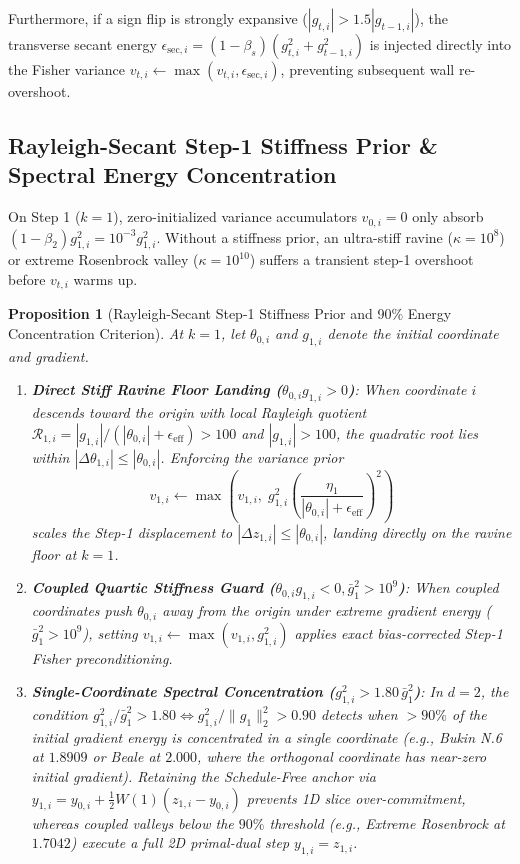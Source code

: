 \documentclass[10pt,twocolumn,letterpaper]{article}
\newtheorem{proposition}[theorem]{Proposition}
\theoremstyle{definition}
\theoremstyle{remark}
\newcommand{\epseff}{\epsilon_{\mathrm{eff}}}
\begin{document}
Furthermore, if a sign flip is strongly expansive ($|g_{t,i}| > 1.5|g_{t-1,i}|$), the transverse secant energy $\epsilon_{\mathrm{sec},i} = (1-\beta_s)(g_{t,i}^2 + g_{t-1,i}^2)$ is injected directly into the Fisher variance $v_{t,i} \leftarrow \max(v_{t,i}, \epsilon_{\mathrm{sec},i})$, preventing subsequent wall re-overshoot.

\subsection{Rayleigh-Secant Step-1 Stiffness Prior \& Spectral Energy Concentration}

On Step 1 ($k=1$), zero-initialized variance accumulators $v_{0,i}=0$ only absorb $(1-\beta_2)g_{1,i}^2 = 10^{-3}g_{1,i}^2$. Without a stiffness prior, an ultra-stiff ravine ($\kappa = 10^8$) or extreme Rosenbrock valley ($\kappa = 10^{10}$) suffers a transient step-1 overshoot before $v_{t,i}$ warms up.

\begin{proposition}[Rayleigh-Secant Step-1 Stiffness Prior and 90\% Energy Concentration Criterion]
\label{prop:step1_prior}
At $k=1$, let $\theta_{0,i}$ and $g_{1,i}$ denote the initial coordinate and gradient.
\begin{enumerate}[leftmargin=*,nosep,label=(\roman*)]
  \item \textbf{Direct Stiff Ravine Floor Landing ($\theta_{0,i} g_{1,i} > 0$)}: When coordinate $i$ descends toward the origin with local Rayleigh quotient $\mathcal{R}_{1,i} = |g_{1,i}| / (|\theta_{0,i}| + \epseff) > 100$ and $|g_{1,i}| > 100$, the quadratic root lies within $|\Delta\theta_{1,i}| \le |\theta_{0,i}|$. Enforcing the variance prior
  \begin{equation}
    v_{1,i} \leftarrow \max\!\left(v_{1,i},\; g_{1,i}^2 \left(\frac{\eta_1}{|\theta_{0,i}| + \epseff}\right)^2\right)
    \label{eq:rayleigh_prior}
  \end{equation}
  scales the Step-1 displacement to $|\Delta z_{1,i}| \le |\theta_{0,i}|$, landing directly on the ravine floor at $k=1$.
  \item \textbf{Coupled Quartic Stiffness Guard ($\theta_{0,i} g_{1,i} < 0, \bar{g}_1^2 > 10^9$)}: When coupled coordinates push $\theta_{0,i}$ away from the origin under extreme gradient energy ($\bar{g}_1^2 > 10^9$), setting $v_{1,i} \leftarrow \max(v_{1,i}, g_{1,i}^2)$ applies exact bias-corrected Step-1 Fisher preconditioning.
  \item \textbf{Single-Coordinate Spectral Concentration ($g_{1,i}^2 > 1.80\,\bar{g}_1^2$)}: In $d=2$, the condition $g_{1,i}^2 / \bar{g}_1^2 > 1.80 \iff g_{1,i}^2 / \|g_1\|_2^2 > 0.90$ detects when $>90\%$ of the initial gradient energy is concentrated in a single coordinate (e.g., Bukin N.6 at $1.8909$ or Beale at $2.000$, where the orthogonal coordinate has near-zero initial gradient). Retaining the Schedule-Free anchor via $y_{1,i} = y_{0,i} + \frac{1}{2}W(1)(z_{1,i} - y_{0,i})$ prevents 1D slice over-commitment, whereas coupled valleys below the $90\%$ threshold (e.g., Extreme Rosenbrock at $1.7042$) execute a full 2D primal-dual step $y_{1,i} = z_{1,i}$.
\end{enumerate}
\end{proposition}
\end{document}
